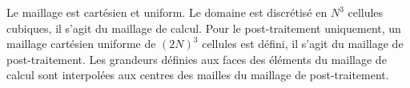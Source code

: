 Le maillage est cartésien et uniform. Le domaine est discrétisé en $N^3$ cellules cubiques, il s'agit du maillage de calcul. Pour le post-traitement uniquement, un maillage cartésien uniforme de $(2N)^3$ cellules est défini, il s'agit du maillage de post-traitement. Les grandeurs définies aux faces des éléments du maillage de calcul sont interpolées aux centres des mailles du maillage de post-traitement.